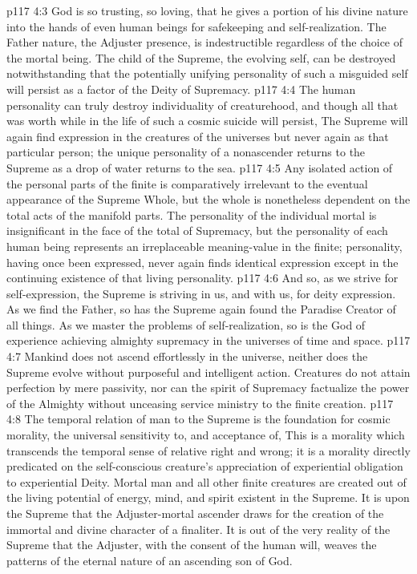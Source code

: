\vs p117 4:3 God is so trusting, so loving, that he gives a portion of his divine nature into the hands of even human beings for safekeeping and self\hyp{}realization. The Father nature, the Adjuster presence, is indestructible regardless of the choice of the mortal being. The child of the Supreme, the evolving self, can be destroyed notwithstanding that the potentially unifying personality of such a misguided self will persist as a factor of the Deity of Supremacy.
\vs p117 4:4 The human personality can truly destroy individuality of creaturehood, and though all that was worth while in the life of such a cosmic suicide will persist,  The Supreme will again find expression in the creatures of the universes but never again as that particular person; the unique personality of a nonascender returns to the Supreme as a drop of water returns to the sea.
\vs p117 4:5 Any isolated action of the personal parts of the finite is comparatively irrelevant to the eventual appearance of the Supreme Whole, but the whole is nonetheless dependent on the total acts of the manifold parts. The personality of the individual mortal is insignificant in the face of the total of Supremacy, but the personality of each human being represents an irreplaceable meaning\hyp{}value in the finite; personality, having once been expressed, never again finds identical expression except in the continuing existence of that living personality.
\vs p117 4:6 And so, as we strive for self\hyp{}expression, the Supreme is striving in us, and with us, for deity expression. As we find the Father, so has the Supreme again found the Paradise Creator of all things. As we master the problems of self\hyp{}realization, so is the God of experience achieving almighty supremacy in the universes of time and space.
\vs p117 4:7 \pc Mankind does not ascend effortlessly in the universe, neither does the Supreme evolve without purposeful and intelligent action. Creatures do not attain perfection by mere passivity, nor can the spirit of Supremacy factualize the power of the Almighty without unceasing service ministry to the finite creation.
\vs p117 4:8 The temporal relation of man to the Supreme is the foundation for cosmic morality, the universal sensitivity to, and acceptance of,  This is a morality which transcends the temporal sense of relative right and wrong; it is a morality directly predicated on the self\hyp{}conscious creature’s appreciation of experiential obligation to experiential Deity. Mortal man and all other finite creatures are created out of the living potential of energy, mind, and spirit existent in the Supreme. It is upon the Supreme that the Adjuster\hyp{}mortal ascender draws for the creation of the immortal and divine character of a finaliter. It is out of the very reality of the Supreme that the Adjuster, with the consent of the human will, weaves the patterns of the eternal nature of an ascending son of God.
